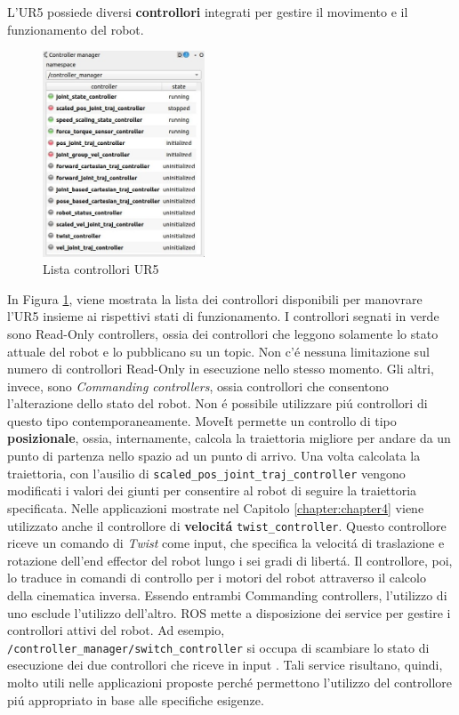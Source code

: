 L'UR5 possiede diversi \textbf{controllori} integrati per gestire il movimento e il funzionamento del robot. 
\begin{figure}[H]
    \centering
    \includegraphics*[width=0.43\textwidth]{images/controller_manager.png}
    \caption{Lista controllori UR5}
    \label{fig:controllers}
\end{figure}
In Figura \ref{fig:controllers}, viene mostrata la lista dei controllori disponibili per manovrare l'UR5 insieme ai rispettivi 
stati di funzionamento. 
I controllori segnati in verde sono Read-Only controllers, ossia dei controllori che leggono solamente lo stato attuale del 
robot e lo pubblicano su un topic. Non c'\'{e} nessuna limitazione sul numero di controllori Read-Only in esecuzione 
nello stesso momento. Gli altri, invece, sono \textit{Commanding controllers}, ossia controllori che consentono l'alterazione dello 
stato del robot. Non \'{e} possibile utilizzare pi\'{u} controllori di questo tipo contemporaneamente. 
MoveIt permette un controllo di tipo \textbf{posizionale}, ossia, internamente, calcola la traiettoria migliore 
per andare da un punto di partenza nello spazio ad un punto di arrivo. 
Una volta calcolata la traiettoria, con l'ausilio di \verb|scaled_pos_joint_traj_controller| 
vengono modificati i valori dei giunti per consentire al robot di seguire la traiettoria specificata. 
Nelle applicazioni mostrate nel Capitolo \ref{chapter:chapter4} viene utilizzato anche il controllore di 
\textbf{velocit\'{a}} \verb|twist_controller|. Questo controllore riceve un comando di \textit{Twist} come input, 
che specifica la velocit\'{a} di traslazione e rotazione dell'end effector del robot lungo i sei gradi di libert\'{a}. 
Il controllore, poi, lo traduce in comandi di controllo per i motori del robot attraverso il calcolo della cinematica inversa.
Essendo entrambi Commanding controllers, l'utilizzo di uno esclude l'utilizzo 
dell'altro. ROS mette a disposizione dei service per gestire i controllori attivi del robot. Ad esempio, 
\verb|/controller_manager/switch_controller| si occupa di scambiare lo stato di esecuzione dei due controllori che riceve 
in input \cite{controller_manager}. Tali service risultano, quindi, molto utili nelle applicazioni proposte perch\'{e} permettono 
l'utilizzo del controllore pi\'{u} appropriato in base alle specifiche esigenze.